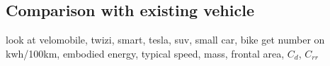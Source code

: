 \subsection{Comparison with existing vehicle}

look at velomobile, twizi, smart, tesla, suv, small car, bike
get number on kwh/100km, embodied energy, typical speed, mass, frontal area, $C_d$, $C_{rr}$

